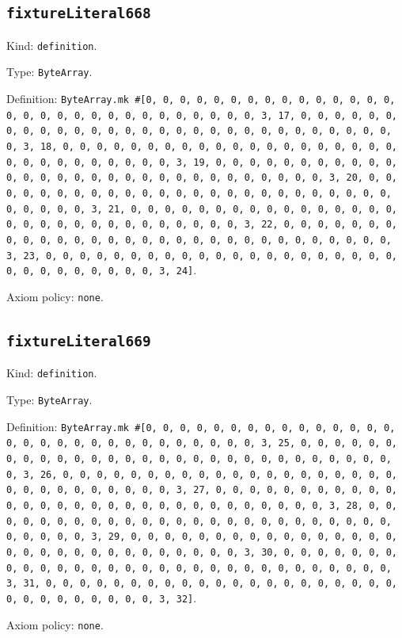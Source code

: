 \documentclass[11pt]{article}
\begin{document}
\subsection*{\texttt{fixtureLiteral668}}
\noindent Kind: \texttt{definition}.\par
\noindent Type: \texttt{ByteArray}.\par
\noindent Definition: \texttt{ByteArray.mk \#[0, 0, 0, 0, 0, 0, 0, 0, 0, 0, 0, 0, 0, 0, 0, 0, 0, 0, 0, 0, 0, 0, 0, 0, 0, 0, 0, 0, 0, 0, 3, 17, 0, 0, 0, 0, 0, 0, 0, 0, 0, 0, 0, 0, 0, 0, 0, 0, 0, 0, 0, 0, 0, 0, 0, 0, 0, 0, 0, 0, 0, 0, 3, 18, 0, 0, 0, 0, 0, 0, 0, 0, 0, 0, 0, 0, 0, 0, 0, 0, 0, 0, 0, 0, 0, 0, 0, 0, 0, 0, 0, 0, 0, 0, 3, 19, 0, 0, 0, 0, 0, 0, 0, 0, 0, 0, 0, 0, 0, 0, 0, 0, 0, 0, 0, 0, 0, 0, 0, 0, 0, 0, 0, 0, 0, 0, 3, 20, 0, 0, 0, 0, 0, 0, 0, 0, 0, 0, 0, 0, 0, 0, 0, 0, 0, 0, 0, 0, 0, 0, 0, 0, 0, 0, 0, 0, 0, 0, 3, 21, 0, 0, 0, 0, 0, 0, 0, 0, 0, 0, 0, 0, 0, 0, 0, 0, 0, 0, 0, 0, 0, 0, 0, 0, 0, 0, 0, 0, 0, 0, 3, 22, 0, 0, 0, 0, 0, 0, 0, 0, 0, 0, 0, 0, 0, 0, 0, 0, 0, 0, 0, 0, 0, 0, 0, 0, 0, 0, 0, 0, 0, 0, 3, 23, 0, 0, 0, 0, 0, 0, 0, 0, 0, 0, 0, 0, 0, 0, 0, 0, 0, 0, 0, 0, 0, 0, 0, 0, 0, 0, 0, 0, 0, 0, 3, 24]}.\par
\noindent Axiom policy: \texttt{none}.\par
\subsection*{\texttt{fixtureLiteral669}}
\noindent Kind: \texttt{definition}.\par
\noindent Type: \texttt{ByteArray}.\par
\noindent Definition: \texttt{ByteArray.mk \#[0, 0, 0, 0, 0, 0, 0, 0, 0, 0, 0, 0, 0, 0, 0, 0, 0, 0, 0, 0, 0, 0, 0, 0, 0, 0, 0, 0, 0, 0, 3, 25, 0, 0, 0, 0, 0, 0, 0, 0, 0, 0, 0, 0, 0, 0, 0, 0, 0, 0, 0, 0, 0, 0, 0, 0, 0, 0, 0, 0, 0, 0, 3, 26, 0, 0, 0, 0, 0, 0, 0, 0, 0, 0, 0, 0, 0, 0, 0, 0, 0, 0, 0, 0, 0, 0, 0, 0, 0, 0, 0, 0, 0, 0, 3, 27, 0, 0, 0, 0, 0, 0, 0, 0, 0, 0, 0, 0, 0, 0, 0, 0, 0, 0, 0, 0, 0, 0, 0, 0, 0, 0, 0, 0, 0, 0, 3, 28, 0, 0, 0, 0, 0, 0, 0, 0, 0, 0, 0, 0, 0, 0, 0, 0, 0, 0, 0, 0, 0, 0, 0, 0, 0, 0, 0, 0, 0, 0, 3, 29, 0, 0, 0, 0, 0, 0, 0, 0, 0, 0, 0, 0, 0, 0, 0, 0, 0, 0, 0, 0, 0, 0, 0, 0, 0, 0, 0, 0, 0, 0, 3, 30, 0, 0, 0, 0, 0, 0, 0, 0, 0, 0, 0, 0, 0, 0, 0, 0, 0, 0, 0, 0, 0, 0, 0, 0, 0, 0, 0, 0, 0, 0, 3, 31, 0, 0, 0, 0, 0, 0, 0, 0, 0, 0, 0, 0, 0, 0, 0, 0, 0, 0, 0, 0, 0, 0, 0, 0, 0, 0, 0, 0, 0, 0, 3, 32]}.\par
\noindent Axiom policy: \texttt{none}.\par
\end{document}
